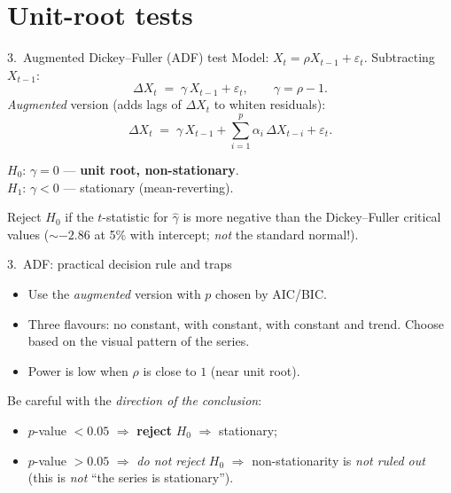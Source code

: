 \documentclass[aspectratio=169]{beamer}
\begin{document}
\section{Unit-root tests}

\begin{frame}{3.~Augmented Dickey--Fuller (ADF) test}
  Model: $X_t = \rho X_{t-1} + \varepsilon_t$. Subtracting $X_{t-1}$:
  \[
    \Delta X_t \;=\; \gamma\, X_{t-1} + \varepsilon_t,
    \qquad \gamma = \rho - 1.
  \]
  \emph{Augmented} version (adds lags of $\Delta X_t$ to whiten residuals):
  \[
    \Delta X_t \;=\; \gamma\, X_{t-1} + \sum_{i = 1}^{p} \alpha_i\, \Delta X_{t-i} + \varepsilon_t.
  \]
  \medskip
  \begin{defbox}[Hypotheses]
    $H_0$: $\gamma = 0$ — \textbf{unit root, non-stationary}.\\
    $H_1$: $\gamma < 0$ — stationary (mean-reverting).
  \end{defbox}
  \medskip
  Reject $H_0$ if the $t$-statistic for $\widehat\gamma$ is more
  negative than the Dickey--Fuller critical values
  ($\sim -2.86$ at 5\% with intercept; \emph{not} the standard normal!).
\end{frame}

\begin{frame}{3.~ADF: practical decision rule and traps}
  \begin{itemize}
    \item Use the \emph{augmented} version with $p$ chosen by AIC/BIC.
    \item Three flavours: no constant, with constant, with constant and
          trend. Choose based on the visual pattern of the series.
    \item Power is low when $\rho$ is close to $1$ (near unit root).
  \end{itemize}
  \medskip
  \begin{warnbox}
    Be careful with the \emph{direction of the conclusion}:
    \begin{itemize}
      \item $p$-value $< 0.05$ $\Rightarrow$ \textbf{reject} $H_0$
            $\Rightarrow$ stationary;
      \item $p$-value $> 0.05$ $\Rightarrow$ \emph{do not reject} $H_0$
            $\Rightarrow$ non-stationarity is \emph{not ruled out}
            (this is \emph{not} ``the series is stationary'').
    \end{itemize}
  \end{warnbox}
\end{frame}
\end{document}
